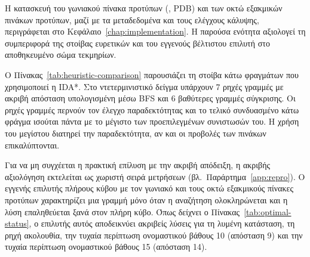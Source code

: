 Η κατασκευή του γωνιακού πίνακα προτύπων (, PDB) και των οκτώ εξακμικών πινάκων προτύπων, μαζί με τα μεταδεδομένα και τους ελέγχους κάλυψης, περιγράφεται στο Κεφάλαιο~\ref{chap:implementation}. Η παρούσα ενότητα αξιολογεί τη συμπεριφορά της στοίβας ευρετικών και του εγγενούς βέλτιστου επιλυτή στο αποθηκευμένο σώμα τεκμηρίων.

Ο Πίνακας~\ref{tab:heuristic-comparison} παρουσιάζει τη στοίβα κάτω φραγμάτων που χρησιμοποιεί η IDA*. Στο ντετερμινιστικό δείγμα υπάρχουν 7 ρηχές γραμμές με ακριβή απόσταση υπολογισμένη μέσω BFS και 6 βαθύτερες γραμμές σύγκρισης. Οι ρηχές γραμμές περνούν τον έλεγχο παραδεκτότητας και το τελικό συνδυασμένο κάτω φράγμα ισούται πάντα με το μέγιστο των προεπιλεγμένων συνιστωσών του. Η χρήση του μεγίστου διατηρεί την παραδεκτότητα, αν και οι προβολές των πινάκων επικαλύπτονται.

\begin{table}[htbp]\centering

\caption[Σύγκριση συνιστωσών κάτω φράγματος της IDA*]{Σύγκριση των συνιστωσών κάτω φράγματος της IDA* (εσφαλμένα τοποθετημένα κυβίδια, γωνιακές και ακμικές προβολές, γωνιακή PDB, συνδυασμένο φράγμα) σε ρηχό και ντετερμινιστικό δείγμα, με έλεγχο παραδεκτότητας στις ρηχές γραμμές. Πηγή: τεκμήριο σύγκρισης ευρετικών του προφίλ .}
\label{tab:heuristic-comparison}
\end{table}

Για να μη συγχέεται η πρακτική επίλυση με την ακριβή απόδειξη, η ακριβής αξιολόγηση εκτελείται ως χωριστή σειρά μετρήσεων (βλ.~Παράρτημα~\ref{app:repro}). Ο εγγενής επιλυτής πλήρους κύβου με τον γωνιακό και τους οκτώ εξακμικούς πίνακες προτύπων χαρακτηρίζει μια γραμμή  μόνο όταν η αναζήτηση ολοκληρώνεται και η λύση επαληθεύεται ξανά στον πλήρη κύβο. Όπως δείχνει ο Πίνακας~\ref{tab:optimal-status}, ο επιλυτής αυτός αποδεικνύει ακριβείς λύσεις για τη λυμένη κατάσταση, τη ρηχή ακολουθία, την τυχαία περίπτωση ονομαστικού βάθους 10 (απόσταση 9) και την τυχαία περίπτωση ονομαστικού βάθους 15 (απόσταση 14).

\begin{table}[htbp]\centering

\caption[Αποτελέσματα του εγγενούς βέλτιστου επιλυτή]{Αποτελέσματα του εγγενούς βέλτιστου επιλυτή με τον γωνιακό και τους οκτώ εξακμικούς πίνακες προτύπων: αρχικό κάτω φράγμα, κατάσταση αποτελέσματος, μήκος λύσης και χρόνος. Πηγή: .}
\label{tab:optimal-status}
\end{table}


